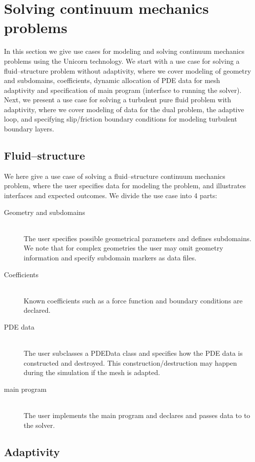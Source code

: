 \section{Solving continuum mechanics problems}

In this section we give use cases for modeling and solving continuum
mechanics problems using the Unicorn technology. We start with a use
case for solving a fluid--structure problem without adaptivity, where
we cover modeling of geometry and subdomains, coefficients, dynamic
allocation of PDE data for mesh adaptivity and specification of main
program (interface to running the solver). Next, we present a use case
for solving a turbulent pure fluid problem with adaptivity, where we
cover modeling of data for the dual problem, the adaptive loop, and
specifying slip/friction boundary conditions for modeling turbulent
boundary layers.


\subsection{Fluid--structure}

We here give a use case of solving a fluid--structure continuum
mechanics problem, where the user specifies data for modeling the
problem, and illustrates interfaces and expected outcomes. We divide
the use case into 4 parts:

\begin{description}
\item[Geometry and subdomains]
\ \\
The user specifies possible geometrical parameters and defines
subdomains. We note that for complex geometries the user may omit
geometry information and specify subdomain markers as data files.
\item[Coefficients]
\ \\
Known coefficients such as a force function and boundary conditions
are declared.
\item[PDE data]
\ \\
The user subclasses a PDEData class and specifies how the PDE data is
constructed and destroyed. This construction/destruction may happen
during the simulation if the mesh is adapted.
\item[main program]
\ \\
The user implements the main program and declares and passes data to
to the solver.
\end{description}

\subsection{Adaptivity}

